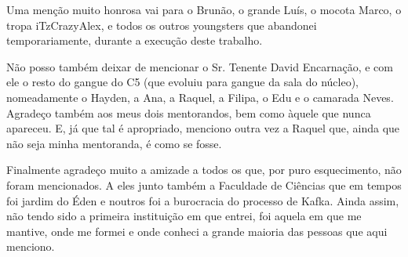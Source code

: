 Uma menção muito honrosa vai para o Brunão, o grande Luís, o mocota Marco, o tropa 
iTzCrazyAlex, e todos os outros youngsters que abandonei temporariamente, durante a execução deste 
trabalho.

Não posso também deixar de mencionar o Sr. Tenente David Encarnação, e com ele o resto do gangue do C5 (que evoluiu 
para gangue da sala do núcleo), nomeadamente o Hayden, a Ana, a Raquel, a Filipa, o Edu e o camarada Neves. Agradeço 
também aos meus dois mentorandos, bem como àquele que nunca apareceu. E, já que tal é apropriado, 
menciono outra vez a Raquel que, ainda que não seja minha mentoranda, é como se fosse. 

Finalmente agradeço muito a amizade a todos os que, por puro esquecimento, não foram mencionados. A eles junto também a Faculdade de 
Ciências que em tempos foi jardim do Éden e noutros foi a burocracia do processo de Kafka. Ainda assim, não 
tendo sido a primeira instituição em que entrei, foi aquela em que me mantive, onde me formei e onde conheci a grande 
maioria das pessoas que aqui menciono.
